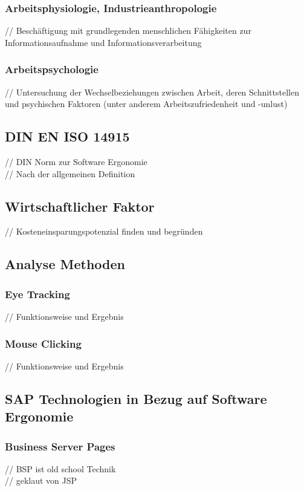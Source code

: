 \documentclass[12pt,a4paper,bibliography=totocnumbered,listof=totocnumbered]{scrartcl}
\begin{document}
\subsubsection{Arbeitsphysiologie, Industrieanthropologie}
// Beschäftigung mit grundlegenden menschlichen Fähigkeiten zur Informationsaufnahme und Informationsverarbeitung\\

\subsubsection{Arbeitspsychologie}
// Untersuchung der Wechselbeziehungen zwischen Arbeit, deren Schnittstellen und psychischen Faktoren (unter anderem Arbeitszufriedenheit und -unlust)\\

\subsection{DIN EN ISO 14915}
// DIN Norm zur Software Ergonomie\\
// Nach der allgemeinen Definition\\

\subsection{Wirtschaftlicher Faktor}
// Kosteneinsparungspotenzial finden und begründen\\

\subsection{Analyse Methoden}
\subsubsection{Eye Tracking}
// Funktionsweise und Ergebnis\\

\subsubsection{Mouse Clicking}
// Funktionsweise und Ergebnis\\

\subsection{SAP Technologien in Bezug auf Software Ergonomie}
\subsubsection{Business Server Pages}
// \ac{BSP} ist old school Technik\\
// geklaut von \ac{JSP}\\
\end{document}
